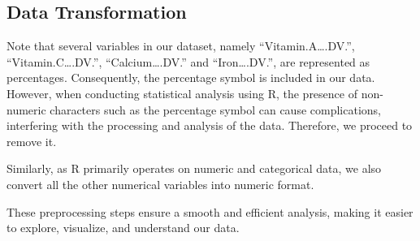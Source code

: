 \documentclass[
]{article}
\begin{document}
\subsection{Data Transformation}\label{data-transformation}

Note that several variables in our dataset, namely
``Vitamin.A\ldots.DV.'', ``Vitamin.C\ldots.DV.'', ``Calcium\ldots.DV.''
and ``Iron\ldots.DV.'', are represented as percentages. Consequently,
the percentage symbol is included in our data. However, when conducting
statistical analysis using R, the presence of non-numeric characters
such as the percentage symbol can cause complications, interfering with
the processing and analysis of the data. Therefore, we proceed to remove
it.

Similarly, as R primarily operates on numeric and categorical data, we
also convert all the other numerical variables into numeric format.

These preprocessing steps ensure a smooth and efficient analysis, making
it easier to explore, visualize, and understand our data.
\end{document}
